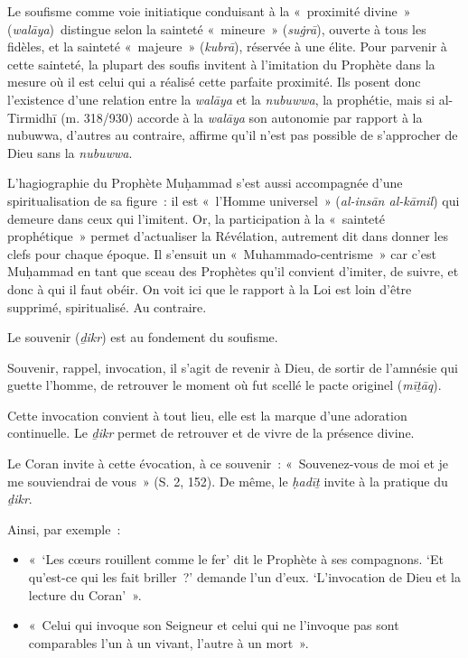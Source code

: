 Le soufisme comme voie initiatique conduisant à la «~proximité divine~»
(\emph{walāya})~distingue selon la sainteté «~mineure~» (\emph{suġrā}),
ouverte à tous les fidèles, et la sainteté «~majeure~» (\emph{kubrā}),
réservée à une élite. Pour parvenir à cette sainteté, la plupart des
soufis invitent à l'imitation du Prophète dans la mesure où il est celui
qui a réalisé cette parfaite proximité. Ils posent donc l'existence
d'une relation entre la \emph{walāya} et la \emph{nubuwwa}, la
prophétie, mais si al-Tirmidhī (m. 318/930) accorde à la \emph{walāya}
son autonomie par rapport à la nubuwwa, d'autres au contraire, affirme
qu'il n'est pas possible de s'approcher de Dieu sans la \emph{nubuwwa}.

L'hagiographie du Prophète Muḥammad s'est aussi accompagnée d'une
spiritualisation de sa figure~: il est «~l'Homme universel~»
(\emph{al-insān al-kāmil}) qui demeure dans ceux qui l'imitent. Or, la
participation à la «~sainteté prophétique~» permet d'actualiser la
Révélation, autrement dit dans donner les clefs pour chaque époque. Il
s'ensuit un «~Muhammado-centrisme~» car c'est Muḥammad en tant que sceau
des Prophètes qu'il convient d'imiter, de suivre, et donc à qui il faut
obéir. On voit ici que le rapport à la Loi est loin d'être supprimé,
spiritualisé. Au contraire.

Le souvenir (\emph{ḏikr}) est au fondement du soufisme.
\begin{Def}[{ḏikr}]
Souvenir,
rappel, invocation, il s'agit de revenir à Dieu, de sortir de l'amnésie
qui guette l'homme, de retrouver le moment où fut scellé le pacte
originel (\emph{mīṯāq}).
\end{Def}
  Cette invocation convient à tout lieu, elle est
la marque d'une adoration continuelle. Le \emph{ḏikr} permet de
retrouver et de vivre de la présence divine.

Le Coran invite à cette évocation, à ce souvenir~: «~Souvenez-vous de
moi et je me souviendrai de vous~» (S. 2, 152). De même, le \emph{ḥadīṯ}
invite à la pratique du \emph{ḏikr}.

Ainsi, par exemple~:

\begin{itemize}
\item
  «~`Les cœurs rouillent comme le fer' dit le Prophète à ses compagnons.
  `Et qu'est-ce qui les fait briller~?' demande l'un d'eux.
  `L'invocation de Dieu et la lecture du Coran'~».
\item
  «~Celui qui invoque son Seigneur et celui qui ne l'invoque pas sont
  comparables l'un à un vivant, l'autre à un mort~».
\end{itemize}

